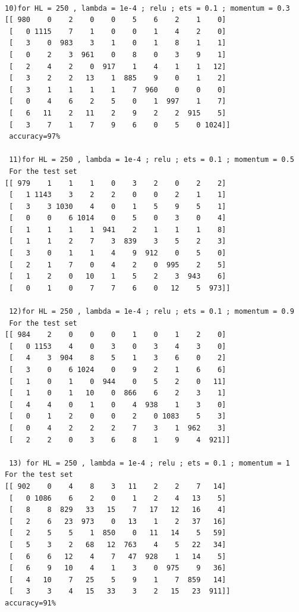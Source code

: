 \documentclass[conference]{IEEEtran}
\begin{document}
 \begin{verbatim}

10)for HL = 250 , lambda = 1e-4 ; relu ; ets = 0.1 ; momentum = 0.3
[[ 980    0    2    0    0    5    6    2    1    0]
 [   0 1115    7    1    0    0    1    4    2    0]
 [   3    0  983    3    1    0    1    8    1    1]
 [   0    2    3  961    0    8    0    3    9    1]
 [   2    4    2    0  917    1    4    1    1   12]
 [   3    2    2   13    1  885    9    0    1    2]
 [   3    1    1    1    1    7  960    0    0    0]
 [   0    4    6    2    5    0    1  997    1    7]
 [   6   11    2   11    2    9    2    2  915    5]
 [   3    7    1    7    9    6    0    5    0 1024]]
 accuracy=97%
 
 11)for HL = 250 , lambda = 1e-4 ; relu ; ets = 0.1 ; momentum = 0.5
 For the test set
[[ 979    1    1    1    0    3    2    0    2    2]
 [   1 1143    3    2    2    0    0    2    1    1]
 [   3    3 1030    4    0    1    5    9    5    1]
 [   0    0    6 1014    0    5    0    3    0    4]
 [   1    1    1    1  941    2    1    1    1    8]
 [   1    1    2    7    3  839    3    5    2    3]
 [   3    0    1    1    4    9  912    0    5    0]
 [   2    1    7    0    4    2    0  995    2    5]
 [   1    2    0   10    1    5    2    3  943    6]
 [   0    1    0    7    7    6    0   12    5  973]]

 12)for HL = 250 , lambda = 1e-4 ; relu ; ets = 0.1 ; momentum = 0.9
 For the test set
[[ 984    2    0    0    0    1    0    1    2    0]
 [   0 1153    4    0    3    0    3    4    3    0]
 [   4    3  904    8    5    1    3    6    0    2]
 [   3    0    6 1024    0    9    2    1    6    6]
 [   1    0    1    0  944    0    5    2    0   11]
 [   1    0    1   10    0  866    6    2    3    1]
 [   4    4    0    1    0    4  938    1    3    0]
 [   0    1    2    0    0    2    0 1083    5    3]
 [   0    4    2    2    2    7    3    1  962    3]
 [   2    2    0    3    6    8    1    9    4  921]]

 13) for HL = 250 , lambda = 1e-4 ; relu ; ets = 0.1 ; momentum = 1
For the test set
[[ 902    0    4    8    3   11    2    2    7   14]
 [   0 1086    6    2    0    1    2    4   13    5]
 [   8    8  829   33   15    7   17   12   16    4]
 [   2    6   23  973    0   13    1    2   37   16]
 [   2    5    5    1  850    0   11   14    5   59]
 [   5    3    2   68   12  763    4    5   22   34]
 [   6    6   12    4    7   47  928    1   14    5]
 [   6    9   10    4    1    3    0  975    9   36]
 [   4   10    7   25    5    9    1    7  859   14]
 [   3    3    4   15   33    3    2   15   23  911]]
accuracy=91%
\end{verbatim}
\end{document}
